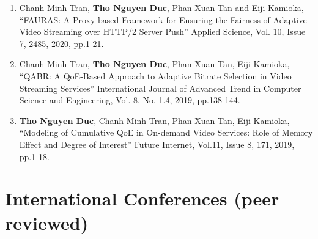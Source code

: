\begin{enumerate}
  \item Chanh Minh Tran, \textbf{Tho Nguyen Duc}, Phan Xuan Tan and Eiji Kamioka, ``FAURAS: A Proxy-based Framework for Ensuring the Fairness of Adaptive Video Streaming over HTTP/2 Server Push'' Applied Science, Vol. 10, Issue 7, 2485, 2020, pp.1-21.
  \item Chanh Minh Tran, \textbf{Tho Nguyen Duc}, Phan Xuan Tan, Eiji Kamioka, ``QABR: A QoE-Based Approach to Adaptive Bitrate Selection in Video Streaming Services'' International Journal of Advanced Trend in Computer Science and Engineering, Vol. 8, No. 1.4, 2019, pp.138-144.
  \item \textbf{Tho Nguyen Duc}, Chanh Minh Tran, Phan Xuan Tan, Eiji Kamioka, ``Modeling of Cumulative QoE in On-demand Video Services: Role of Memory Effect and Degree of Interest'' Future Internet, Vol.11, Issue 8, 171, 2019, pp.1-18.
\end{enumerate}

\section*{International Conferences (peer reviewed)}

